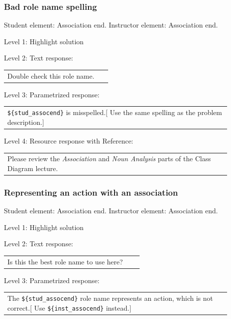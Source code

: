\subsubsection{Bad role name spelling}

Student element: Association end. Instructor element: Association end. \medskip

\noindent Level 1: Highlight solution  \medskip

\noindent Level 2: Text response: \medskip

\begin{tabular}{|p{0.9\linewidth}}
Double check this role name.
\end{tabular} \medskip

\noindent Level 3: Parametrized response: \medskip

\begin{tabular}{|p{0.9\linewidth}}
\verb|${stud_assocend}| is misspelled.[ Use the same spelling as the problem description.]
\end{tabular} \medskip

\noindent Level 4: Resource response with Reference: \medskip

\begin{tabular}{|p{0.9\linewidth}}
Please review the \textit{Association} and \textit{Noun Analysis} parts of the Class Diagram lecture.
\end{tabular} \medskip


\subsubsection{Representing an action with an association}

Student element: Association end. Instructor element: Association end. \medskip

\noindent Level 1: Highlight solution  \medskip

\noindent Level 2: Text response: \medskip

\begin{tabular}{|p{0.9\linewidth}}
Is this the best role name to use here?
\end{tabular} \medskip

\noindent Level 3: Parametrized response: \medskip

\begin{tabular}{|p{0.9\linewidth}}
The \verb|${stud_assocend}| role name represents an action, which is not correct.[ Use \verb|${inst_assocend}| instead.]
\end{tabular} \medskip

